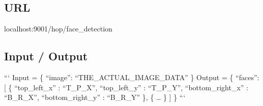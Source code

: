 \subsection*{U\-R\-L}

{\ttfamily localhost\-:9001/hop/face\-\_\-detection}

\subsection*{Input / Output}

``` Input = \{ “image”\-: “\-T\-H\-E\-\_\-\-A\-C\-T\-U\-A\-L\-\_\-\-I\-M\-A\-G\-E\-\_\-\-D\-A\-T\-A” \} {\ttfamily  } Output = \{ “faces”\-: \mbox{[} \{ “top\-\_\-left\-\_\-x” \-: “\-T\-\_\-\-P\-\_\-\-X”, “top\-\_\-left\-\_\-y” \-: “\-T\-\_\-\-P\-\_\-\-Y”, “bottom\-\_\-right\-\_\-x” \-: “\-B\-\_\-\-R\-\_\-\-X”, “bottom\-\_\-right\-\_\-y” \-: “\-B\-\_\-\-R\-\_\-\-Y” \}, \{ … \} \mbox{]} \} ``` 